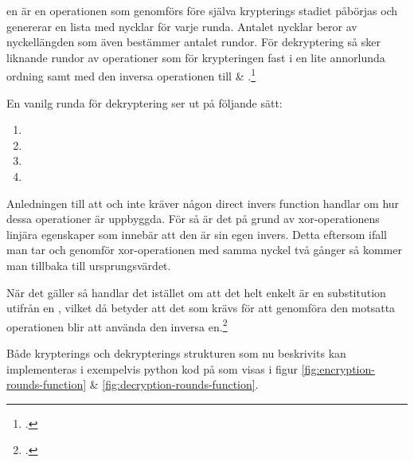 en är en operationen som genomförs före själva krypterings stadiet påbörjas
och genererar en lista med nycklar för varje runda. Antalet nycklar beror av nyckellängden som även bestämmer antalet rundor.
För dekryptering så sker liknande rundor av operationer som för krypteringen fast
i en lite annorlunda ordning samt med den inversa operationen till  \& .\footcite{daemen1999aes}

En vanilg runda för dekryptering ser ut på följande sätt:

\begin{enumerate}
    \item {}
    \item {}
    \item {}
    \item {}
\end{enumerate}

Anledningen till att  och  inte kräver någon direct invers function handlar om hur dessa operationer
är uppbyggda. För  så är det på grund av \gls{xor}-operationens linjära egenskaper som innebär att den är sin egen invers.
Detta eftersom ifall man tar och genomför \gls{xor}-operationen med samma nyckel två gånger så kommer man tillbaka till ursprungsvärdet.

När det gäller 
så handlar det istället om att det helt enkelt är en substitution utifrån en , vilket då betyder att det som krävs för att genomföra den motsatta operationen
blir att använda den inversa en.\footcite{daemen1999aes}

Både krypterings och dekrypterings strukturen som nu beskrivits kan implementeras i exempelvis \gls{python} kod på som visas i figur \ref{fig:encryption-rounds-function} \& \ref{fig:decryption-rounds-function}.

